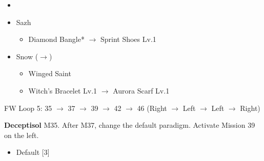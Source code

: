 \begin{menu}
	\begin{itemize}
	\paradigm
		\begin{itemize}
			\item {}%
				{\paradigmline{\com}{\sen}{\med}}%
				{\paradigmline{\sab}{\sen}{\sab}}%
				{\paradigmline{(\syn)}{\sen}{(\sab)}}%
				{\paradigmline[4]{\com}{\com}{\sab}}%
				{\paradigmline{\rav}{\sen}{\rav}}%
				{\paradigmline{\rav}{\rav}{\rav}}%
		\end{itemize}
	\equip
		\begin{itemize}
			\item Sazh
				\begin{itemize}
					\item Diamond Bangle* $\rightarrow$ Sprint Shoes Lv.1
				\end{itemize}
			\item Snow ($\rightarrow$)
				\begin{itemize}
					\item Winged Saint
					\item Witch's Bracelet Lv.1 $\rightarrow$ Aurora Scarf Lv.1
				\end{itemize}
		\end{itemize}
	\end{itemize}
\end{menu}

\renewcommand{\third}{[3] Premeditation (\syn/\sen/\sab)}

FW Loop 5: 35 $\rightarrow$ 37 $\rightarrow$ 39 $\rightarrow$ 42 $\rightarrow$ 46 (Right $\rightarrow$ Left $\rightarrow$ Left $\rightarrow$ Right)

\textbf{Deceptisol} M35.
After M37, change the default paradigm.
Activate Mission 39 on the left.

\begin{menu}
	\begin{itemize}
	\paradigm
		\begin{itemize}
			\item Default [3]
		\end{itemize}
	\end{itemize}
\end{menu}

